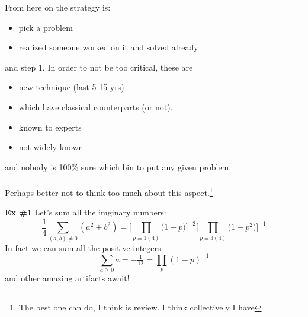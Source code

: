 \documentclass[12pt]{article}
\begin{document}
\selectfont \fontsize{25}{30}\selectfont

\noindent From here on the strategy is:
\begin{itemize}
\item pick a problem
\item realized someone worked on it and solved already
\end{itemize}
and step 1.  In order to not be too critical, these are 
\begin{itemize}
\item new technique (last 5-15 yrs) 
\item which have classical counterparts (or not).
\item known to experts
\item not widely known
\end{itemize}
and nobody is 100\% sure which bin to put any given problem. \\ \\
Perhaps better not to think too much about this aspect.\footnote{The best one can do, I think is review.  I think collectively I have } 

\newpage

\noindent \textbf{Ex \#1} Let's sum all the imginary numbers:
$$ \frac{1}{4}\sum_{(a,b) \neq 0} (a^2 + b^2) = \bigg[ \prod_{p \equiv 1 (4)} \big(1-p\big) \bigg]^{-2}
\bigg[ \prod_{p \equiv 3 (4)} \big(1-p^2\big) \bigg]^{-1}
 $$
In fact we can sum all the positive integers:
$$ \sum_{a \geq 0} a = - \tfrac{1}{12} = \prod_p (1-p)^{-1}$$
and other amazing artifacts await!
\end{document}
